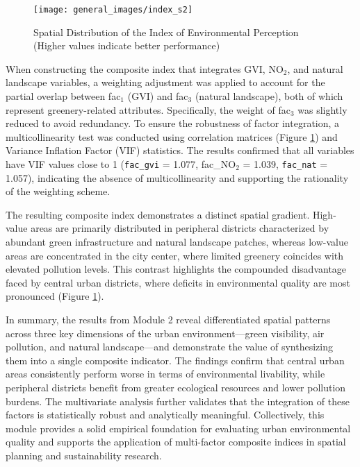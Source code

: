 \documentclass[
  12pt,
  oneside]{book}
\begin{document}
\begin{figure}

{\centering \texttt{[image: general\_images/index\_s2]} 

}

\caption{Spatial Distribution of the Index of Environmental Perception (Higher values indicate better performance)}\label{fig:indexs2}
\end{figure}

When constructing the composite index that integrates GVI, NO\(_2\), and natural landscape variables, a weighting adjustment was applied to account for the partial overlap between fac\(_1\) (GVI) and fac\(_3\) (natural landscape), both of which represent greenery-related attributes. Specifically, the weight of fac\(_3\) was slightly reduced to avoid redundancy. To ensure the robustness of factor integration, a multicollinearity test was conducted using correlation matrices (Figure \ref{fig:indexs2}) and Variance Inflation Factor (VIF) statistics. The results confirmed that all variables have VIF values close to 1 (\texttt{fac\_gvi} = 1.077, fac\_NO\(_2\) = 1.039, \texttt{fac\_nat} = 1.057), indicating the absence of multicollinearity and supporting the rationality of the weighting scheme.

The resulting composite index demonstrates a distinct spatial gradient. High-value areas are primarily distributed in peripheral districts characterized by abundant green infrastructure and natural landscape patches, whereas low-value areas are concentrated in the city center, where limited greenery coincides with elevated pollution levels. This contrast highlights the compounded disadvantage faced by central urban districts, where deficits in environmental quality are most pronounced (Figure \ref{fig:indexs2}).

In summary, the results from Module 2 reveal differentiated spatial patterns across three key dimensions of the urban environment---green visibility, air pollution, and natural landscape---and demonstrate the value of synthesizing them into a single composite indicator. The findings confirm that central urban areas consistently perform worse in terms of environmental livability, while peripheral districts benefit from greater ecological resources and lower pollution burdens. The multivariate analysis further validates that the integration of these factors is statistically robust and analytically meaningful. Collectively, this module provides a solid empirical foundation for evaluating urban environmental quality and supports the application of multi-factor composite indices in spatial planning and sustainability research.
\end{document}
